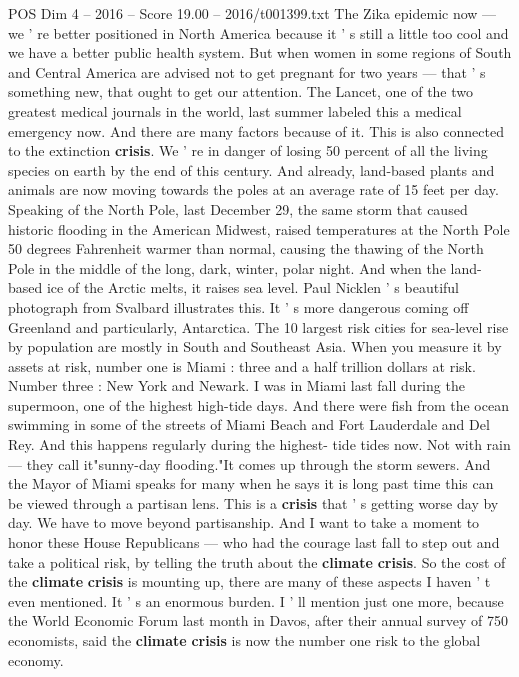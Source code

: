 \begin{textsample}{POS Dim 4 – 2016 – Score 19.00 – 2016/t001399.txt}
The Zika epidemic now — we ' re better positioned in North America because it ' s still a little too cool and we have a better public health system.
But when women in some regions of South and Central America are advised not to get pregnant for two years — that ' s something new, that ought to get our attention.
The Lancet, one of the two greatest medical journals in the world, last summer labeled this a medical emergency now.
And there are many factors because of it.
This is also connected to the extinction \textbf{crisis}.
We ' re in danger of losing 50 percent of all the living species on earth by the end of this century.
And already, land-based plants and animals are now moving towards the poles at an average rate of 15 feet per day.
Speaking of the North Pole, last December 29, the same storm that caused historic flooding in the American Midwest, raised temperatures at the North Pole 50 degrees Fahrenheit warmer than normal, causing the thawing of the North Pole in the middle of the long, dark, winter, polar night.
And when the land- based ice of the Arctic melts, it raises sea level.
Paul Nicklen ' s beautiful photograph from Svalbard illustrates this.
It ' s more dangerous coming off Greenland and particularly, Antarctica.
The 10 largest risk cities for sea-level rise by population are mostly in South and Southeast Asia.
When you measure it by assets at risk, number one is Miami : three and a half trillion dollars at risk.
Number three : New York and Newark.
I was in Miami last fall during the supermoon, one of the highest high-tide days.
And there were fish from the ocean swimming in some of the streets of Miami Beach and Fort Lauderdale and Del Rey.
And this happens regularly during the highest- tide tides now.
Not with rain — they call it"sunny-day flooding."It comes up through the storm sewers.
And the Mayor of Miami speaks for many when he says it is long past time this can be viewed through a partisan lens.
This is a \textbf{crisis} that ' s getting worse day by day.
We have to move beyond partisanship.
And I want to take a moment to honor these House Republicans — who had the courage last fall to step out and take a political risk, by telling the truth about the \textbf{climate} \textbf{crisis}.
So the cost of the \textbf{climate} \textbf{crisis} is mounting up, there are many of these aspects I haven ' t even mentioned.
It ' s an enormous burden.
I ' ll mention just one more, because the World Economic Forum last month in Davos, after their annual survey of 750 economists, said the \textbf{climate} \textbf{crisis} is now the number one risk to the global economy.

\end{textsample}
